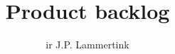 \newcommand*{\BOOKCLASS}{}


\title{Product backlog}
\author{ir J.P. Lammertink}
\maketitle
\tableofcontents



